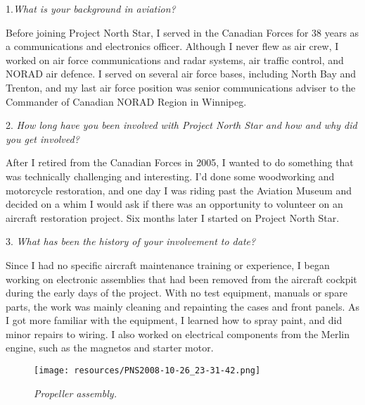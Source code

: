 \begin{multicols}{2}

1.\textit{What is your background in aviation?}

Before joining Project North Star, I served in the Canadian Forces for
38 years as a communications and electronics officer.  Although I
never flew as air crew, I worked on air force communications and radar
systems, air traffic control, and NORAD air defence.  I served on
several air force bases, including North Bay and Trenton, and my last
air force position was senior communications adviser to the Commander
of Canadian NORAD Region in Winnipeg.

2. \textit{How long have you been involved with Project North Star and how and why did you get involved?}

After I retired from the Canadian Forces in 2005, I wanted to do
something that was technically challenging and interesting.  I'd done
some woodworking and motorcycle restoration, and one day I was riding
past the Aviation Museum and decided on a whim I would ask if there
was an opportunity to volunteer on an aircraft restoration project.
Six months later I started on Project North Star.


3. \textit{What has been the history of your involvement to date?}

Since I had no specific aircraft maintenance training or experience, I
began working on electronic assemblies that had been removed from the
aircraft cockpit during the early days of the project.  With no test
equipment, manuals or spare parts, the work was mainly cleaning and
repainting the cases and front panels.  As I got more familiar with
the equipment, I learned how to spray paint, and did minor repairs to
wiring.  I also worked on electrical components from the Merlin
engine, such as the magnetos and starter motor. 

\begin{figure}[htbp]
	\vspace{2em}
	\centering
	\texttt{[image: resources/PNS2008-10-26\_23-31-42.png]}
	\caption*{\small \em Propeller assembly.}
	\label{fig:propeller}
\end{figure}


\end{multicols}
